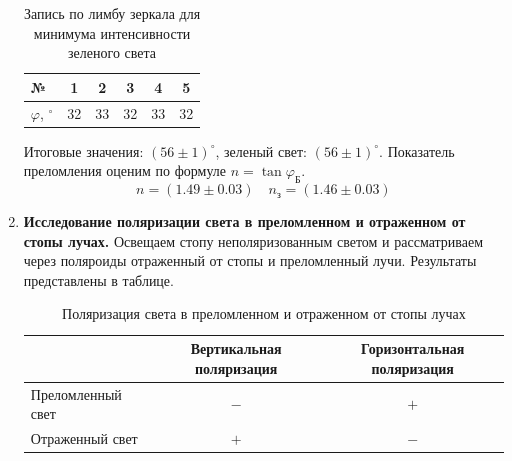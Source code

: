 \documentclass[12pt]{article}
\begin{document}
\begin{enumerate}
        \begin{table}[h!]
            \centering
            \caption{Запись по лимбу зеркала для минимума интенсивности зеленого света}
            \label{tab:4}
            \begin{tabular}{|l|ccccc|}
                \hline
                №                     & 1  & 2  & 3  & 4  & 5  \\\hline
                $\varphi$, $^{\circ}$ & 32 & 33 & 32 & 33 & 32 \\
                \hline
            \end{tabular}
        \end{table}

        Итоговые значения: $(56\pm1)^{\circ}$, зеленый свет: $(56\pm1)^{\circ}$.
        Показатель преломления оценим по формуле $n = \tan \varphi_{\text{Б}}$.
        \[
            n = (1.49 \pm 0.03) \quad n_{\text{з}} = (1.46 \pm 0.03)
        \]


        \item \textbf{Исследование поляризации света в преломленном и отраженном от стопы лучах.}
        Освещаем стопу неполяризованным светом и рассматриваем через поляроиды отраженный от стопы и преломленный лучи.
        Результаты представлены в таблице.
        \begin{table}[h!]
            \centering
            \caption{Поляризация света в преломленном и отраженном от стопы лучах}
            \label{tab:5}
            \begin{tabular}{|l|cc|}
                \hline
                & Вертикальная поляризация & Горизонтальная поляризация \\\hline
                Преломленный свет & $-$                      & $+$                        \\
                Отраженный свет   & $+$                      & $-$                        \\
                \hline
            \end{tabular}
        \end{table}


\end{enumerate}
\end{document}
